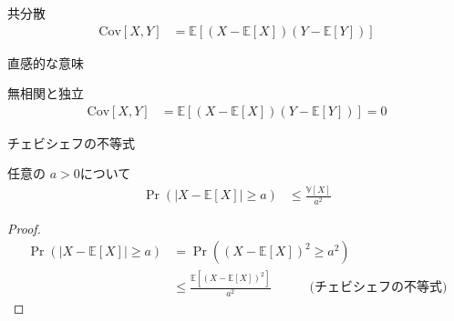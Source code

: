 \documentclass[lualatex,handout]{beamer}
\newcommand{\expt}[1]{\mathbb{E}\left[#1\right]}
\newcommand{\var}[1]{\mathbb{V}\left[#1\right]}
\newcommand{\cov}[1]{\mathrm{Cov}\left[#1\right]}
\theoremstyle{definition}
\begin{document}
\begin{frame}{共分散}
\begin{align*}
\cov{X,Y} &= \expt{(X-\expt{X})(Y-\expt{Y})}
\end{align*}

\vspace{1em}
直感的な意味
\end{frame}

\begin{frame}{無相関と独立}
\begin{align*}
\cov{X,Y} &= \expt{(X-\expt{X})(Y-\expt{Y})} = 0
\end{align*}
\end{frame}

\begin{frame}{チェビシェフの不等式}
\begin{lemma}[チェビシェフの不等式]
任意の $a>0$について
\begin{align*}
\Pr(|X-\expt{X}|\ge a) &\le \frac{\var{X}}{a^2}
\end{align*}
\end{lemma}
\begin{proof}
\begin{align*}
\Pr(|X-\expt{X}|\ge a) &=\Pr((X-\expt{X})^2\ge a^2)\\
&\le\frac{\expt{(X-\expt{X})^2}}{a^2}\hspace{3em}\text{(チェビシェフの不等式)}
\end{align*}
\end{proof}
\end{frame}
\end{document}
